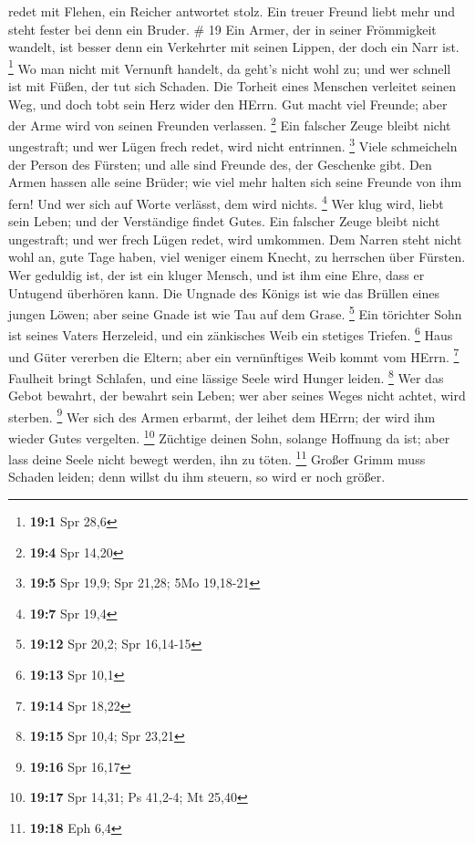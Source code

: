 redet mit Flehen, ein Reicher antwortet stolz.  Ein treuer
Freund liebt mehr und steht fester bei denn ein Bruder. \# 19
 Ein Armer, der in seiner Frömmigkeit wandelt, ist besser
denn ein Verkehrter mit seinen Lippen, der doch ein Narr ist.
\footnote{\textbf{19:1} Spr 28,6}  Wo man nicht mit Vernunft
handelt, da geht's nicht wohl zu; und wer schnell ist mit Füßen, der tut
sich Schaden.  Die Torheit eines Menschen verleitet seinen
Weg, und doch tobt sein Herz wider den HErrn.  Gut macht
viel Freunde; aber der Arme wird von seinen Freunden verlassen.
\footnote{\textbf{19:4} Spr 14,20}  Ein falscher Zeuge
bleibt nicht ungestraft; und wer Lügen frech redet, wird nicht
entrinnen. \footnote{\textbf{19:5} Spr 19,9; Spr 21,28; 5Mo 19,18-21}
 Viele schmeicheln der Person des Fürsten; und alle sind
Freunde des, der Geschenke gibt.  Den Armen hassen alle
seine Brüder; wie viel mehr halten sich seine Freunde von ihm fern! Und
wer sich auf Worte verlässt, dem wird nichts. \footnote{\textbf{19:7}
  Spr 19,4}  Wer klug wird, liebt sein Leben; und der
Verständige findet Gutes.  Ein falscher Zeuge bleibt nicht
ungestraft; und wer frech Lügen redet, wird umkommen.  Dem
Narren steht nicht wohl an, gute Tage haben, viel weniger einem Knecht,
zu herrschen über Fürsten.  Wer geduldig ist, der ist ein
kluger Mensch, und ist ihm eine Ehre, dass er Untugend überhören kann.
 Die Ungnade des Königs ist wie das Brüllen eines jungen
Löwen; aber seine Gnade ist wie Tau auf dem Grase. \footnote{\textbf{19:12}
  Spr 20,2; Spr 16,14-15}  Ein törichter Sohn ist seines
Vaters Herzeleid, und ein zänkisches Weib ein stetiges Triefen.
\footnote{\textbf{19:13} Spr 10,1}  Haus und Güter vererben
die Eltern; aber ein vernünftiges Weib kommt vom HErrn. \footnote{\textbf{19:14}
  Spr 18,22}  Faulheit bringt Schlafen, und eine lässige
Seele wird Hunger leiden. \footnote{\textbf{19:15} Spr 10,4; Spr 23,21}
 Wer das Gebot bewahrt, der bewahrt sein Leben; wer aber
seines Weges nicht achtet, wird sterben. \footnote{\textbf{19:16} Spr
  16,17}  Wer sich des Armen erbarmt, der leihet dem HErrn;
der wird ihm wieder Gutes vergelten. \footnote{\textbf{19:17} Spr 14,31;
  Ps 41,2-4; Mt 25,40}  Züchtige deinen Sohn, solange
Hoffnung da ist; aber lass deine Seele nicht bewegt werden, ihn zu
töten. \footnote{\textbf{19:18} Eph 6,4}  Großer Grimm muss
Schaden leiden; denn willst du ihm steuern, so wird er noch größer.
